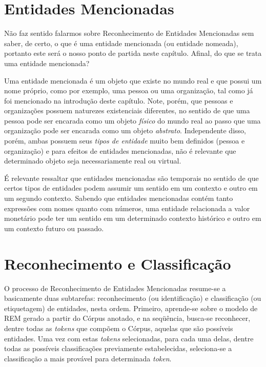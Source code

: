 \documentclass[11pt]{report}
\begin{document}
\section{Entidades Mencionadas}

\indent\indent Não faz sentido falarmos sobre Reconhecimento de Entidades Mencionadas sem saber, de certo, o que é uma entidade mencionada (ou entidade nomeada), portanto este
será o nosso ponto de partida neste capítulo. Afinal, do que se trata uma entidade mencionada?

Uma entidade mencionada é um objeto que existe no mundo real e que possui um nome próprio, como por exemplo, uma pessoa ou uma organização, tal como já foi mencionado na introdução
deste capítulo. Note, porém, que pessoas e organizações possuem naturezes existenciais diferentes, no sentido de que uma pessoa pode ser encarada como um objeto \textit{físico} do mundo real
ao passo que uma organização pode ser encarada como um objeto \textit{abstrato}. Independente disso, porém, ambas possuem seus \textit{tipos de entidade} muito bem definidos
(pessoa e organização) e para efeitos de entidades mencionadas, não é relevante que determinado objeto seja necessariamente real ou virtual.

É relevante ressaltar que entidades mencionadas são temporais no sentido de que certos tipos de entidades podem assumir um sentido em um contexto e outro em um segundo contexto.
Sabendo que entidades mencionadas contém tanto expressões com nomes quanto com números, uma entidade relacionada a valor monetário pode ter um sentido em um determinado
contexto histórico e outro em um contexto futuro ou passado.

\section{Reconhecimento e Classificação}

\indent\indent O processo de Reconhecimento de Entidades Mencionadas resume-se a basicamente duas subtarefas: reconhecimento (ou identificação) e classificação (ou etiquetagem)
de entidades, nesta ordem. Primeiro, aprende-se sobre o modelo de REM gerado a partir do Córpus anotado, e na seqüência, busca-se reconhecer, dentre todas as \textit{tokens}
que compõem o Córpus, aquelas que são possíveis entidades. Uma vez com estas \textit{tokens} selecionadas, para cada uma delas, dentre todas as possíveis classificações
previamente estabelecidas, seleciona-se a classificação a mais provável para determinada \textit{token}.
\end{document}
